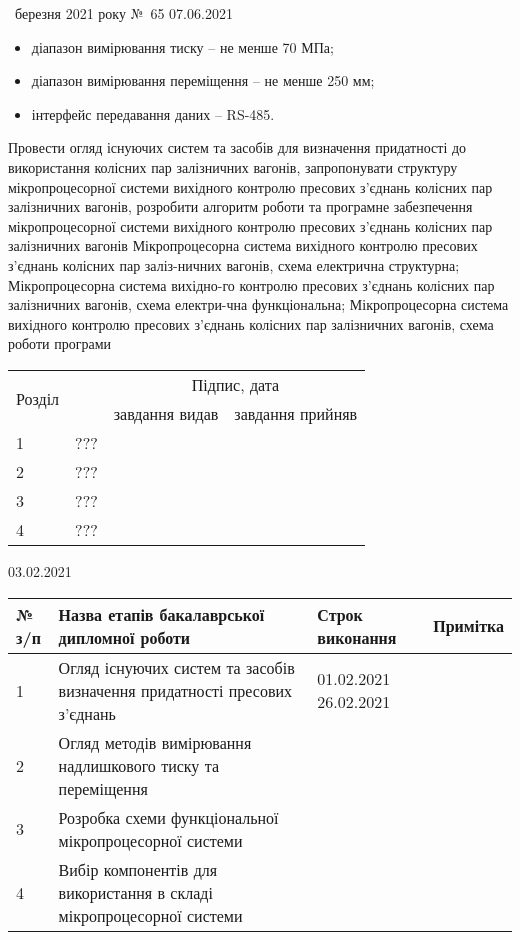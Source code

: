 \begin{assignment}%
{\guillemotright~березня 2021 року №~65}
%
{07.06.2021}
%
{\begin{itemize}
\item {діапазон вимірювання тиску – не менше 70 МПа;}
\item {діапазон вимірювання переміщення – не менше 250 мм;}
\item {інтерфейс передавання даних – RS-485.}
\end{itemize}}
%
{Провести огляд існуючих систем та засобів для визначення придатності до використання колісних пар залізничних вагонів, запропонувати структуру мікропроцесорної системи вихідного контролю пресових з’єднань колісних пар залізничних вагонів, розробити алгоритм роботи та програмне забезпечення мікропроцесорної системи вихідного контролю пресових з’єднань колісних пар залізничних вагонів}
%
{Мікропроцесорна система вихідного контролю пресових з’єднань колісних пар заліз-ничних вагонів, схема електрична структурна; Мікропроцесорна система вихідно-го контролю пресових з’єднань колісних пар залізничних вагонів, схема електри-чна функціональна; Мікропроцесорна система вихідного контролю пресових з’єднань колісних пар залізничних вагонів, схема роботи програми}
%
{\begin{tabular}{|p{1.8cm}|p{8.4cm}|p{2.5cm}|p{2.5cm}|}\hline
  \multirow{2}{*}{Розділ} & \multirow{2}{*}{\parbox{8.4cm}{}} & \multicolumn{2}{c|}{Підпис, дата} \\ \cline{3-4}
  & & завдання видав & завдання прийняв \\ \hline
  1 & ??? &  &  \\ \hline 
  2 & ??? &  &  \\ \hline
  3 & ??? &  &  \\ \hline
  4 & ??? &  &  \\ \hline
\end{tabular}}
%
{03.02.2021}
%
{\begin{tabular}{|p{0.8cm}|p{9.0cm}|p{3.4cm}|p{2.0cm}|}\hline
  № з/п & Назва етапів бакалаврської дипломної роботи & Строк виконання & Примітка \\ \hline
  1 & Огляд існуючих систем та засобів визначення придатності  пресових з’єднань & 01.02.2021 26.02.2021 &  \\ \hline 
  2 & Огляд методів вимірювання надлишкового тиску та переміщення &  &  \\ \hline
  3 & Розробка схеми функціональної мікропроцесорної системи &  &  \\ \hline
  4 & Вибір компонентів для використання в складі мікропроцесорної  системи &  &  \\ \hline
\end{tabular}}
\end{assignment} 